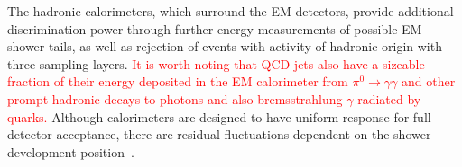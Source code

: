
The hadronic calorimeters, which surround the EM detectors,
provide additional discrimination power through further energy measurements of
possible EM shower tails, as well as rejection of events with activity of
hadronic origin with three sampling layers. \textcolor{red}{It is worth noting that QCD jets also have a sizeable fraction of their energy deposited in the EM calorimeter from $\pi^{0}\rightarrow\gamma\gamma$
and other prompt hadronic decays to photons and also bremsstrahlung $\gamma$ radiated by quarks.}
Although calorimeters are designed 
to have uniform response for full detector acceptance, there are residual fluctuations 
dependent on the shower development position~\cite{Wigmans2017}.


